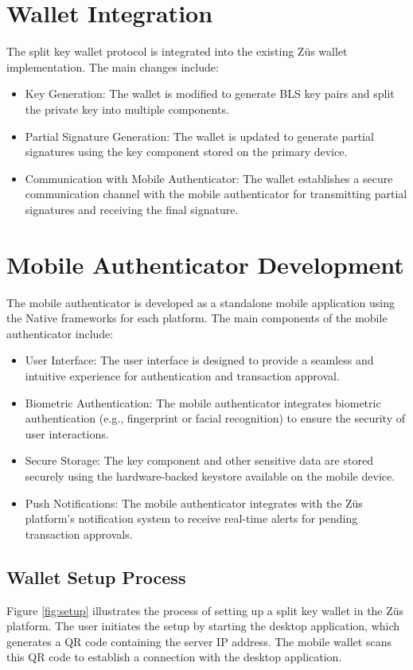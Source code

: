 \section{Wallet Integration}
The split key wallet protocol is integrated into the existing Züs wallet implementation. The main changes include:
\begin{itemize}
    \item Key Generation: The wallet is modified to generate BLS key pairs and split the private key into multiple components.
    \item Partial Signature Generation: The wallet is updated to generate partial signatures using the key component stored on the primary device.
    \item Communication with Mobile Authenticator: The wallet establishes a secure communication channel with the mobile authenticator for transmitting partial signatures and receiving the final signature.
\end{itemize}


\section{Mobile Authenticator Development}
The mobile authenticator is developed as a standalone mobile application using the Native frameworks for each platform. The main components of the mobile authenticator include:
\begin{itemize}
    \item User Interface: The user interface is designed to provide a seamless and intuitive experience for authentication and transaction approval.
    \item Biometric Authentication: The mobile authenticator integrates biometric authentication (e.g., fingerprint or facial recognition) to ensure the security of user interactions.
    \item Secure Storage: The key component and other sensitive data are stored securely using the hardware-backed keystore available on the mobile device.
    \item Push Notifications: The mobile authenticator integrates with the Züs platform's notification system to receive real-time alerts for pending transaction approvals.
\end{itemize}

\subsection{Wallet Setup Process}
Figure \ref{fig:setup} illustrates the process of setting up a split key wallet in the Züs platform. The user initiates the setup by starting the desktop application, which generates a QR code containing the server IP address. The mobile wallet scans this QR code to establish a connection with the desktop application.

